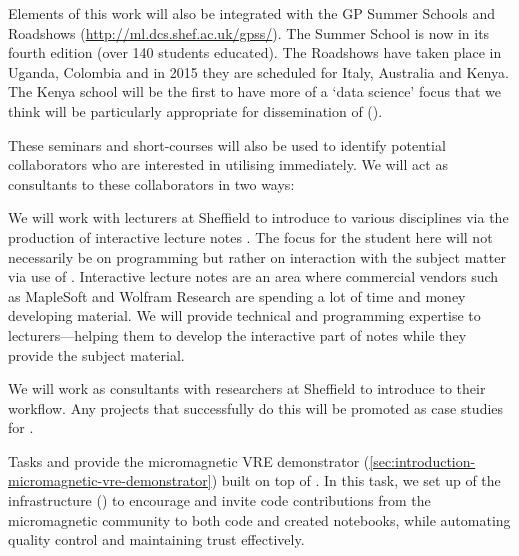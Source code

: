 \begin{workpackage}
\begin{tasklist}
\begin{task}[title=Introduce \TheProject to researchers and teachers, id=project-intro,lead=USH,PM=8]
Elements of this work will also be integrated with the GP Summer
Schools and Roadshows (\url{http://ml.dcs.shef.ac.uk/gpss/}). The
Summer School is now in its fourth edition (over 140 students
educated). The Roadshows have taken place in Uganda, Colombia and in
2015 they are scheduled for Italy, Australia and Kenya. The Kenya
school will be the first to have more of a `data science' focus that
we think will be particularly appropriate for dissemination of
\TheProject ().

These seminars and short-courses will also be used to identify potential
collaborators who are interested in utilising \TheProject
immediately. We will act as consultants to these collaborators in two
ways:

We will work with lecturers at Sheffield to introduce \TheProject to
various disciplines via the production of interactive lecture
notes . The focus for the student here will not necessarily be on
programming but rather on interaction with the subject matter via use
of \TheProject. Interactive lecture notes are an area where commercial
vendors such as MapleSoft and Wolfram Research are spending a lot of
time and money developing material. We will provide technical and
programming expertise to lecturers---helping them to develop the
interactive part of notes while they provide the subject material.

We will work as consultants with researchers at Sheffield to introduce
\TheProject to their workflow. Any projects that successfully do this
will be promoted as case studies for \TheProject.
\end{task}

\begin{task}[id=dissemination-of-oommf-nb-virtual-environment,
  title=Open source dissemination of micromagnetic VRE,
  lead=USO,PM=4,partners={SR,USH,PS}]
  Tasks  and
   provide the
  micromagnetic VRE demonstrator
  (\ref{sec:introduction-micromagnetic-vre-demonstrator}) built on top
  of \TheProject.  In this task, we set up of the infrastructure
  () to encourage
  and invite code contributions from the micromagnetic community to
  both code and created notebooks, while automating quality control
  and maintaining trust effectively.


\end{task}
\end{tasklist}
\end{workpackage}

